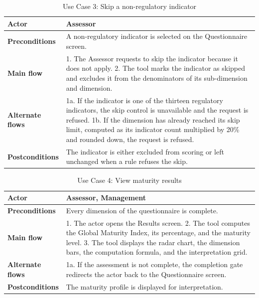 \begin{table}[H]
\centering
\caption{Use Case 3: Skip a non-regulatory indicator} \label{tab:uc03}
\begin{tabular}{|p{3cm}|p{12cm}|}
\hline
\textbf{Actor} & Assessor \\
\hline
\textbf{Preconditions} & A non-regulatory indicator is selected on the Questionnaire screen. \\
\hline
\textbf{Main flow} & 1. The Assessor requests to skip the indicator because it does not apply. 2. The tool marks the indicator as skipped and excludes it from the denominators of its sub-dimension and dimension. \\
\hline
\textbf{Alternate flows} & 1a. If the indicator is one of the thirteen regulatory indicators, the skip control is unavailable and the request is refused. 1b. If the dimension has already reached its skip limit, computed as its indicator count multiplied by 20\% and rounded down, the request is refused. \\
\hline
\textbf{Postconditions} & The indicator is either excluded from scoring or left unchanged when a rule refuses the skip. \\
\hline
\end{tabular}

\end{table}

\begin{table}[H]
\centering
\caption{Use Case 4: View maturity results} \label{tab:uc04}
\begin{tabular}{|p{3cm}|p{12cm}|}
\hline
\textbf{Actor} & Assessor, Management \\
\hline
\textbf{Preconditions} & Every dimension of the questionnaire is complete. \\
\hline
\textbf{Main flow} & 1. The actor opens the Results screen. 2. The tool computes the Global Maturity Index, its percentage, and the maturity level. 3. The tool displays the radar chart, the dimension bars, the computation formula, and the interpretation grid. \\
\hline
\textbf{Alternate flows} & 1a. If the assessment is not complete, the completion gate redirects the actor back to the Questionnaire screen. \\
\hline
\textbf{Postconditions} & The maturity profile is displayed for interpretation. \\
\hline
\end{tabular}

\end{table}

